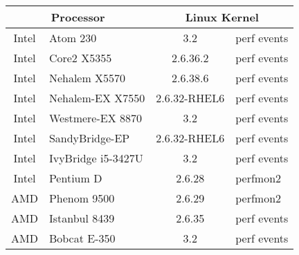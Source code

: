 \begin{tabular}{|c@{ }l|c@{ }l|}

\hline
\multicolumn{2}{|c|}{Processor} &
\multicolumn{2}{|c|}{Linux Kernel} \\
\hline
\hline
Intel  & Atom 230         & 3.2 & perf events \\  %
\hline
Intel  & Core2 X5355      & 2.6.36.2 & perf events \\  %
\hline
Intel  & Nehalem X5570    & 2.6.38.6 & perf events \\  %
\hline
Intel  & Nehalem-EX X7550 & 2.6.32-RHEL6 & perf events \\  %
\hline
Intel  & Westmere-EX 8870 & 3.2 & perf events \\     %
\hline
Intel  & SandyBridge-EP   & 2.6.32-RHEL6 & perf events \\  %
\hline
Intel  & IvyBridge i5-3427U & 3.2  & perf events \\  %
\hline
Intel  & Pentium D        & 2.6.28 & perfmon2    \\  %
\hline
AMD    & Phenom 9500      & 2.6.29 & perfmon2    \\  %
\hline
AMD    & Istanbul 8439    & 2.6.35 & perf events \\  %
\hline
AMD    & Bobcat  E-350    & 3.2    & perf events \\  %
\hline

\end{tabular}

